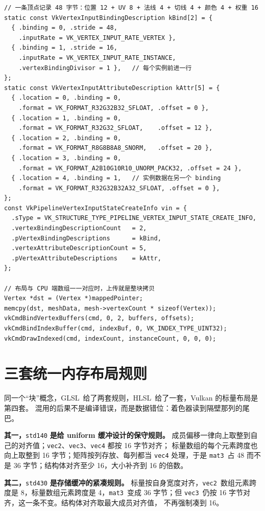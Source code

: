 \documentclass[12pt,a4paper,fontset=fandol]{ctexbook}
\newcommand{\Tp}[1]{\texttt{#1}}
\newcommand{\Lang}[1]{\textsf{#1}}
\newcommand{\GSL}{\Lang{GLSL}}
\newcommand{\HSL}{\Lang{HLSL}}
\begin{document}
\begin{lstlisting}[style=cstyle,caption={交错布局的顶点输入描述、缓冲绑定与上传写入},label={lst:ch03-vin-desc}]
// 一条顶点记录 48 字节：位置 12 + UV 8 + 法线 4 + 切线 4 + 颜色 4 + 权重 16
static const VkVertexInputBindingDescription kBind[2] = {
  { .binding = 0, .stride = 48,
    .inputRate = VK_VERTEX_INPUT_RATE_VERTEX },
  { .binding = 1, .stride = 16,
    .inputRate = VK_VERTEX_INPUT_RATE_INSTANCE,
    .vertexBindingDivisor = 1 },   // 每个实例前进一行
};
static const VkVertexInputAttributeDescription kAttr[5] = {
  { .location = 0, .binding = 0,
    .format = VK_FORMAT_R32G32B32_SFLOAT, .offset = 0 },
  { .location = 1, .binding = 0,
    .format = VK_FORMAT_R32G32_SFLOAT,    .offset = 12 },
  { .location = 2, .binding = 0,
    .format = VK_FORMAT_R8G8B8A8_SNORM,   .offset = 20 },
  { .location = 3, .binding = 0,
    .format = VK_FORMAT_A2B10G10R10_UNORM_PACK32, .offset = 24 },
  { .location = 4, .binding = 1,   // 实例数据在另一个 binding
    .format = VK_FORMAT_R32G32B32A32_SFLOAT, .offset = 0 },
};
const VkPipelineVertexInputStateCreateInfo vin = {
  .sType = VK_STRUCTURE_TYPE_PIPELINE_VERTEX_INPUT_STATE_CREATE_INFO,
  .vertexBindingDescriptionCount   = 2,
  .pVertexBindingDescriptions      = kBind,
  .vertexAttributeDescriptionCount = 5,
  .pVertexAttributeDescriptions    = kAttr,
};

// 布局与 CPU 端数组一一对应时，上传就是整块拷贝
Vertex *dst = (Vertex *)mappedPointer;
memcpy(dst, meshData, mesh->vertexCount * sizeof(Vertex));
vkCmdBindVertexBuffers(cmd, 0, 2, buffers, offsets);
vkCmdBindIndexBuffer(cmd, indexBuf, 0, VK_INDEX_TYPE_UINT32);
vkCmdDrawIndexed(cmd, indexCount, instanceCount, 0, 0, 0);
\end{lstlisting}

\section{三套统一内存布局规则}

同一个``块''概念，\GSL\ 给了两套规则，\HSL\ 给了一套，Vulkan 的标量布局是第四套。
混用的后果不是编译错误，而是数据错位：着色器读到隔壁那列的尾巴。

\textbf{其一，}\Tp{std140}\textbf{ 是给 uniform 缓冲设计的保守规则。}
成员偏移一律向上取整到自己的对齐值；\Tp{vec2}、\Tp{vec3}、\Tp{vec4} 都按 16 字节对齐；
标量数组的每个元素跨度也向上取整到 16 字节；矩阵按列存放、每列都当 \Tp{vec4} 处理，于是
\Tp{mat3}\ 占 48 而不是 36 字节；结构体对齐至少 16，大小补齐到 16 的倍数。

\textbf{其二，}\Tp{std430}\textbf{ 是存储缓冲的紧凑规则。}
标量按自身宽度对齐，\Tp{vec2}\ 数组元素跨度是 8，标量数组元素跨度是 4，\Tp{mat3}\ 变成
36 字节；但 \Tp{vec3}\ 仍按 16 字节对齐，这一条不变。结构体对齐取最大成员对齐值，
不再强制凑到 16。
\end{document}
